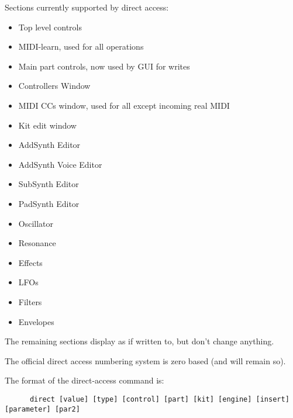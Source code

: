    Sections currently supported by direct access:

   \begin{itemize}
      \item Top level controls
      \item MIDI-learn, used for all operations
      \item Main part controls, now used by GUI for writes
      \item Controllers Window
      \item MIDI CCs window, used for all except incoming real MIDI
      \item Kit edit window
      \item AddSynth Editor
      \item AddSynth Voice Editor
      \item SubSynth Editor
      \item PadSynth Editor
      \item Oscillator
      \item Resonance
      \item Effects
      \item LFOs
      \item Filters
      \item Envelopes
   \end{itemize}

   The remaining sections display as if written to, but don't
   change anything.

   The official direct access numbering system is zero based (and will remain so).

%
%

   The format of the direct-access command is:

   \begin{verbatim}
      direct [value] [type] [control] [part] [kit] [engine] [insert] [parameter] [par2]
   \end{verbatim}

